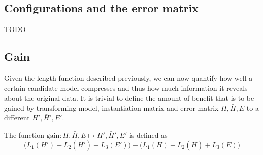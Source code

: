 \documentclass[a4paper,notoc,oneside]{tufte-book}
\begin{document}
\subsection{Configurations and the error matrix}

TODO

\subsection{Gain}

Given the length function described previously, we can now quantify how well a certain candidate model compresses and thus how much information it reveals about the original data. It is trivial to define the amount of benefit that is to be gained by transforming model, instantiation matrix and error matrix $H,\bar{H},E$ to a different $H',\bar{H}',E'$.

\begin{definition}
The function $\mathrm{gain}: H,\bar{H},E \mapsto H',\bar{H}',E'$ is defined as
$$
\Big(L_1(H') + L_2(\bar{H}') + L_3(E')\Big) - \Big(L_1(H) + L_2(\bar{H}) + L_3(E)\Big)
$$
\end{definition}
\end{document}
